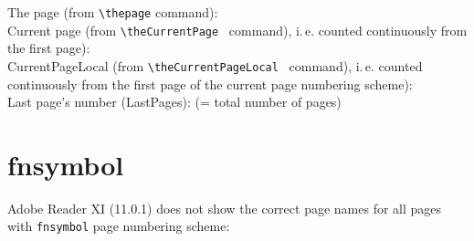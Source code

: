 \documentclass[british]{article}
\begin{document}
\noindent The page (from \verb|\thepage| command): \thepage \\

\noindent Current page (from \verb|\theCurrentPage|\ %
command), i.\,e. counted continuously from the first page): \theCurrentPage \\

\noindent CurrentPageLocal (from \verb|\theCurrentPageLocal|\ %
command), i.\,e. counted continuously from the first page of the
current page numbering scheme): \theCurrentPageLocal\\

\noindent Last page's number (LastPages): 
(= total number of pages)\\

\lipsum[1-7]

\newpage


\section{fnsymbol}

Adobe Reader XI (11.0.1) does not show the correct page names
for all pages with \texttt{fnsymbol} page numbering scheme:
\end{document}
